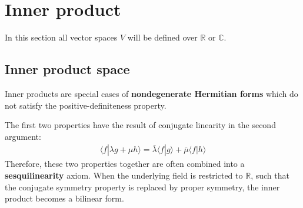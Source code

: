 \section{Inner product}\label{section:innerproduct}

    In this section all vector spaces $V$ will be defined over $\mathbb{R}$ or $\mathbb{C}$.

\subsection{Inner product space}

    \begin{remark}\label{linalgebra:NDH_form}
        Inner products are special cases of \textbf{nondegenerate Hermitian forms} which do not satisfy the positive-definiteness property.
    \end{remark}
    \begin{result}
        The first two properties have the result of conjugate linearity in the second argument:
        \begin{gather}
            \langle f|\lambda g + \mu h \rangle = \overline{\lambda}\langle f|g \rangle + \overline{\mu}\langle f|h \rangle
        \end{gather}
        Therefore, these two properties together are often combined into a \textbf{sesquilinearity} axiom. When the underlying field is restricted to $\mathbb{R}$, such that the conjugate symmetry property is replaced by proper symmetry, the inner product becomes a bilinear form.
    \end{result}

